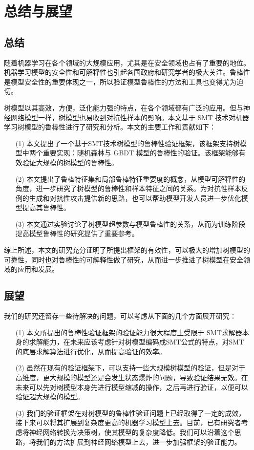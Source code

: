 \chapter{总结与展望}
\label{ch6}
\section{总结}
随着机器学习在各个领域的大规模应用，尤其是在安全领域也占有了重要的地位。机器学习模型的安全性和可解释性也引起各国政府和研究学者的极大关注。鲁棒性是模型安全性的重要体现之一，所以验证模型鲁棒性的方法和工具也变得尤为迫切。

树模型以其高效，方便，泛化能力强的特点，在各个领域都有广泛的应用。但与神经网络模型一样，树模型也易收到对抗性样本的影响。本文基于 SMT 技术对机器学习树模型的鲁棒性进行了研究和分析。本文的主要工作和贡献如下：
\begin{enumerate}
\item [(1)] 本文提出了一个基于SMT技术树模型的鲁棒性验证框架，该框架支持树模型中两个重要实现：随机森林与 GBDT 模型的鲁棒性的验证。该框架能够有效验证大规模的树模型的鲁棒性。
\item [(2)] 本文提出了鲁棒特征集和局部鲁棒特征重要度的概念，从模型可解释性的角度，进一步研究了树模型的鲁棒性和样本特征之间的关系。为对抗性样本反例的生成和对抗性攻击提供新的思路，也可以帮助模型开发人员进一步优化模型提高其鲁棒性。
\item [(3)] 本文通过实验讨论了树模型超参数与模型鲁棒性的关系，从而为训练阶段提高模型鲁棒性的研究提供了重要参考。
\end{enumerate}

综上所述，本文的研究充分证明了所提出框架的有效性，可以极大的增加树模型的可靠性，同时也对鲁棒性的可解释性做了研究，从而进一步推进了树模型在安全领域的应用和发展。

\section{展望}

我们的研究还留存一些待解决的问题，可以考虑从下面的几个方面展开研究：
\begin{enumerate}
\item [(1)] 本文所提出的鲁棒性验证框架的验证能力很大程度上受限于 SMT求解器本身的求解能力，在未来应该考虑针对树模型编码成SMT公式的特点，对SMT的底层求解算法进行优化，从而提高验证的效率。
\item [(2)] 虽然在现有的验证框架下，可以支持一些大规模树模型的验证，但是对于高维度，更大规模的模型还是会发生状态爆炸的问题，导致验证结果无效。在未来可以先对树模型本身先进行模型缩减的操作，之后再进行验证，以便可以验证超大规模的模型。
\item[(3)] 我们的验证框架在对树模型的鲁棒性验证问题上已经取得了一定的成效，接下来可以将其扩展到复杂度更高的机器学习模型上去。目前，已有研究者考虑将神经网络转换为决策树，使其模型的复杂度降低。我们可以沿着这个思路，将我们的方法扩展到神经网络模型上去，进一步加强框架的验证能力。
\end{enumerate}

